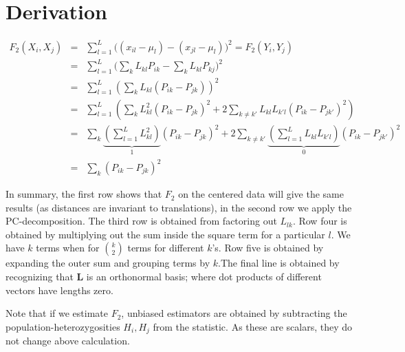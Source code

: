 \documentclass[12pt,fullpage, a4paper]{article}
\newcommand{\ML}{\mathbf{L}} %
\begin{document}
\section{Derivation}\label{appendix:fonpc}
\begin{eqnarray}
F_2(X_i, X_j) &=& \sum_{l=1}^L \big( (x_{il} - \mu_l) -(x_{jl} -\mu_l)\big)^2 = F_2(Y_i, Y_j)\nonumber\\
&=& \sum_{l=1}^L \big( \sum_k L_{kl}P_{ik} - \sum_kL_{kl}P_{kj}\big)^2\nonumber\\
&=& \sum_{l=1}^L \left( \sum_k L_{kl} (P_{ik} -P_{jk}) \right)^2\nonumber\\
&=& \sum_{l=1}^L \left( \sum_k L_{kl}^2 (P_{ik} -P_{jk})^2 + 2\sum_{k\neq k'} L_{kl}L_{k'l}(P_{ik} - P_{jk'})^2 \right)\nonumber\\
&=& \sum_k \underbrace{\left(\sum_{l=1}^L L_{kl}^2\right)}_1 (P_{ik} -P_{jk})^2 + 2\sum_{k\neq k'}\underbrace{\left(\sum_{l=1}^L L_{kl}L_{k'l}\right)}_{0} (P_{ik} - P_{jk'})^2\nonumber\\
&=& \sum_k (P_{ik} - P_{jk})^2
\end{eqnarray}

In summary, the first row shows that $F_2$ on the centered data will give the same results (as distances are invariant to translations), in the second row we apply the PC-decomposition. The third row is obtained from factoring out $L_{lk}$. Row four is obtained by multiplying out the sum inside the square term for a particular $l$. We have $k$ terms when for $\binom{k}{2}$ terms for different $k$'s.  Row five is obtained by expanding the outer sum and grouping terms by $k$.The final line is obtained by recognizing that $\ML$ is an orthonormal basis; where dot products of different vectors have lengths zero.

Note that if we estimate $F_2$, unbiased estimators are obtained by subtracting the population-heterozygosities $H_i, H_j$ from the statistic. As these are scalars, they do not change above calculation.


\end{document}
